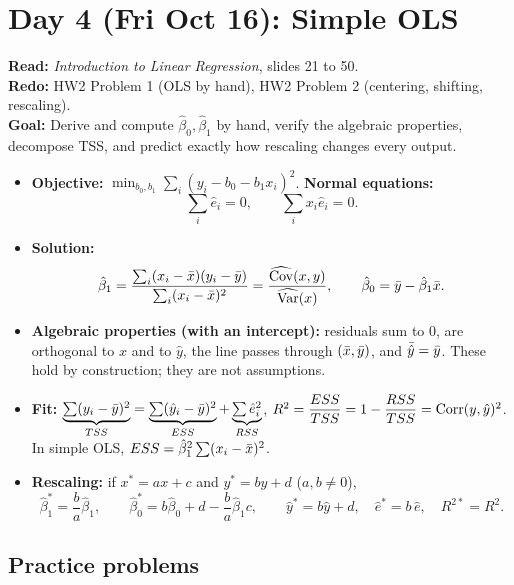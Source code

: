 \documentclass[11pt]{article}
\begin{document}
\clearpage
\section{Day 4 (Fri Oct 16): Simple OLS}

\begin{planbox}
\textbf{Read:} \emph{Introduction to Linear Regression}, slides 21 to 50.\\
\textbf{Redo:} HW2 Problem 1 (OLS by hand), HW2 Problem 2 (centering, shifting, rescaling).\\
\textbf{Goal:} Derive and compute $\hat\beta_0,\hat\beta_1$ by hand, verify the algebraic properties, decompose TSS, and predict exactly how rescaling changes every output.
\end{planbox}

\begin{keybox}
\begin{itemize}
  \item \textbf{Objective:} $\min_{b_0,b_1}\sum_{i}(y_i-b_0-b_1x_i)^2$. \quad \textbf{Normal equations:}
  \[ \sum_i \hat e_i=0, \qquad \sum_i x_i\hat e_i=0. \]
  \item \textbf{Solution:}
  \[ \hat\beta_1=\frac{\sum_i(x_i-\bar{x})(y_i-\bar{y})}{\sum_i(x_i-\bar{x})^2}=\frac{\widehat{\operatorname{Cov}}(x,y)}{\widehat{\operatorname{Var}}(x)}, \qquad \hat\beta_0=\bar{y}-\hat\beta_1\bar{x}. \]
  \item \textbf{Algebraic properties (with an intercept):} residuals sum to 0, are orthogonal to $x$ and to $\hat y$, the line passes through $(\bar{x},\bar{y})$, and $\bar{\hat y}=\bar{y}$. These hold by construction; they are not assumptions.
  \item \textbf{Fit:} $\underbrace{\textstyle\sum(y_i-\bar{y})^2}_{TSS}=\underbrace{\textstyle\sum(\hat y_i-\bar{y})^2}_{ESS}+\underbrace{\textstyle\sum\hat e_i^2}_{RSS}$, \quad $R^2=\dfrac{ESS}{TSS}=1-\dfrac{RSS}{TSS}=\operatorname{Corr}(y,\hat y)^2$. In simple OLS, $ESS=\hat\beta_1^2\sum(x_i-\bar{x})^2$.
  \item \textbf{Rescaling:} if $x^*=ax+c$ and $y^*=by+d$ ($a,b\ne0$),
  \[ \hat\beta_1^*=\frac{b}{a}\hat\beta_1, \qquad \hat\beta_0^*=b\hat\beta_0+d-\frac{b}{a}\hat\beta_1c, \qquad \hat y^*=b\hat y+d,\quad \hat e^*=b\,\hat e,\quad R^{2*}=R^2. \]
\end{itemize}
\end{keybox}

\subsection{Practice problems}
\setcounter{prob}{0}
\end{document}
